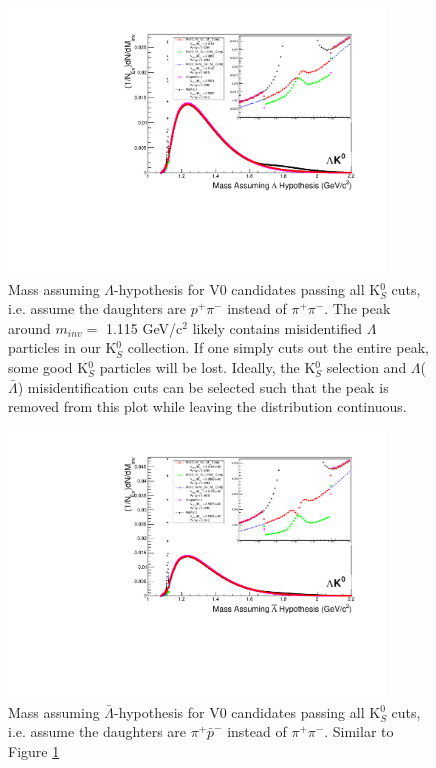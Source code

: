 \documentclass[../AnalysisNoteJBuxton.tex]{subfiles}
\begin{document}
\begin{figure}[h]
  \centering
  \includegraphics[width=100mm]{3_DataSelection/Figures/MassAssHypotheses/canMassAssLamHypCompare_LamK0_wNoMisID.pdf}
  \caption[$\Lambda$ contamination in K$^{0}_{S}$ collection]{Mass assuming $\Lambda$-hypothesis for V0 candidates passing all K$^{0}_{S}$ cuts, i.e. assume the daughters are $p^{+}\pi^{-}$ instead of $\pi^{+}\pi^{-}$.  The peak around $m_{inv} = $ 1.115 GeV/c$^{2}$ likely contains misidentified $\Lambda$ particles in our K$^{0}_{S}$ collection.  If one simply cuts out the entire peak, some good K$^{0}_{S}$ particles will be lost.  Ideally, the K$^{0}_{S}$ selection and $\Lambda$($\bar{\Lambda}$) misidentification cuts can be selected such that the peak is removed from this plot while leaving the distribution continuous.}
  \label{fig:MassAssLamHyp}
\end{figure}


\begin{figure}[h]
  \centering
  \includegraphics[width=100mm]{3_DataSelection/Figures/MassAssHypotheses/canMassAssALamHypCompare_LamK0_wNoMisID.pdf}
  \caption[$\bar{\Lambda}$ contamination in K$^{0}_{S}$ collection]{Mass assuming $\bar{\Lambda}$-hypothesis for V0 candidates passing all K$^{0}_{S}$ cuts, i.e. assume the daughters are $\pi^{+}\bar{p}^{-}$ instead of $\pi^{+}\pi^{-}$.  Similar to Figure \ref{fig:MassAssLamHyp}}
  \label{fig:MassAssALamHyp}
\end{figure}
\end{document}

